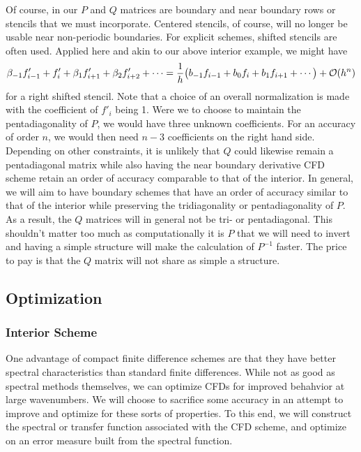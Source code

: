 Of course, in our $P$ and $Q$ matrices are boundary and near boundary rows or stencils that we must incorporate.  
Centered stencils, of course, will no longer be usable near  non-periodic boundaries.  For explicit schemes, shifted stencils are often used.  Applied here and akin to our above interior example, we might have  
\begin{equation}
\beta_{-1} f_{i-1}' + f_i' + \beta_1 f_{i+1}' + \beta_2 f_{i+2}' + \cdots = {1 \over h} \bigl( b_{-1} f_{i-1} + b_0 f_i + b_1 f_{i+1} + \cdots \bigr) + {\cal O}(h^n)
\end{equation}
for a right shifted stencil.  Note that a choice of an overall normalization is made with the coefficient of $f'_i$ being 1.   Were we to choose to maintain the pentadiagonality of $P$, we would have three unknown coefficients.  For an accuracy of order $n$, we would then need $n-3$ coefficients on the right hand side. Depending on other constraints, it is unlikely that $Q$ could likewise remain a pentadiagonal matrix while also having the near boundary derivative CFD scheme retain an order of accuracy comparable to that of the interior.  In general, we will aim to have boundary schemes that have an order of accuracy similar to that of the interior while preserving the tridiagonality or pentadiagonality of $P$.  As a result, the $Q$ matrices will in general not be tri- or pentadiagonal.  This shouldn't matter too much as computationally it is $P$ that we will need to invert and having a simple structure will make the calculation of $P^{-1}$ faster.  The price to pay is that the $Q$ matrix will not share as simple a structure.  

\subsection{Optimization}
\subsubsection{Interior Scheme}

One advantage of compact finite difference schemes are that they have better spectral characteristics than standard finite differences.  While not as good as spectral methods themselves, we can optimize CFDs for improved behahvior at large wavenumbers.  %
We will choose to sacrifice some accuracy in an attempt to improve and optimize for these sorts of properties.  To this end, we will construct the spectral or transfer function associated with the CFD scheme, and optimize on an error measure built from the spectral function.~\cite{Lele1992,Kim2007} 

